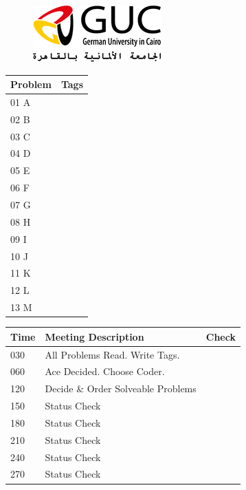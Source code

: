 \documentclass[twocolumn]{article}
\begin{document}
	\begin{figure}
		\begin{center}
			\includegraphics{guc_logo}
		\end{center}
	\end{figure}

	\tableofcontents

	\begin{tabular}{| l || m{7cm} | }
		\hline
		\textbf{Problem} & \textbf{Tags}\\	\hline
		01 A & \\	\hline
		02 B & \\	\hline
		03 C & \\	\hline
		04 D & \\	\hline
		05 E & \\	\hline
		06 F & \\	\hline
		07 G & \\	\hline
		08 H & \\	\hline
		09 I & \\	\hline
		10 J & \\	\hline
		11 K & \\	\hline
		12 L & \\	\hline
		13 M & \\	\hline
	\end{tabular}
	\newline\newline\newline
	\begin{tabular}{| l | l || m{12mm}| }
		\hline
		\textbf{Time} & \textbf{Meeting Description} & \textbf{Check} \\	\hline
		030 & All Problems Read. Write Tags. & 	\\	\hline
		060 & Ace Decided. Choose Coder.	&	\\	\hline
		120 & Decide \& Order Solveable Problems &	\\	\hline
		150 & Status Check &	\\	\hline
		180 & Status Check &	\\	\hline
		210 & Status Check &	\\	\hline
		240 & Status Check &	\\	\hline
		270 & Status Check &	\\	\hline
	\end{tabular}
	\newpage
\end{document}

